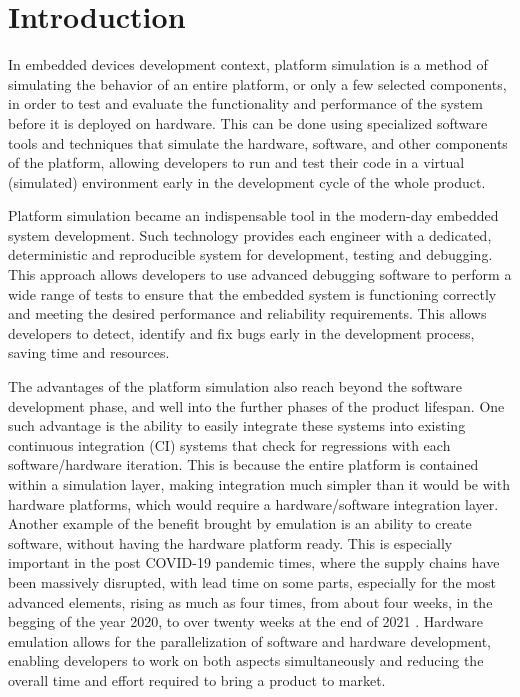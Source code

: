
\chapter{Introduction}

In embedded devices development context, platform simulation is a method of simulating 
the behavior of an entire platform, or only a few selected components, in order to test and evaluate
the functionality and performance of the system before it is deployed on hardware. This can be done using specialized
software tools and techniques that simulate the hardware, software, and other components of the platform,
allowing developers to run and test their code in a virtual (simulated) environment early in the development cycle of the whole product.

Platform simulation became an indispensable tool in the modern-day embedded system development. Such technology
provides each engineer with a dedicated, deterministic and reproducible system for development, testing and debugging.
This approach allows developers to use advanced debugging software to perform a wide range of tests to ensure that
the embedded system is functioning correctly and meeting the desired performance and reliability requirements. 
This allows developers to detect, identify and fix bugs early in the development process, saving time and resources.

The advantages of the platform simulation also reach beyond the software development phase, and well into the further
phases of the product lifespan. One such advantage is the ability to easily integrate these systems into existing
continuous integration (CI) systems that check for regressions with each software/hardware iteration.
This is because the entire platform is contained within a simulation layer, making integration much simpler than it
would be with hardware platforms, which would require a hardware/software integration layer. Another example of
the benefit brought by emulation is 
an ability to create software, without having the hardware platform ready.
This is especially important in the post COVID-19 pandemic times, where the 
supply chains have been massively
disrupted, with lead time on some parts, especially for the most advanced elements, rising as much as four times,
from about four weeks, in the begging of the year 2020, to over twenty weeks at the end of 2021
\cite{Covid19-AUTOMOTIVE} \cite{Covid19-LEAD-TIME} \cite{Covid19-LEAD-TIME-BLOOMBERG}. Hardware emulation allows for
the parallelization of software and hardware development, enabling developers to work on both aspects
simultaneously and reducing the overall time and effort required to bring a product to market.

